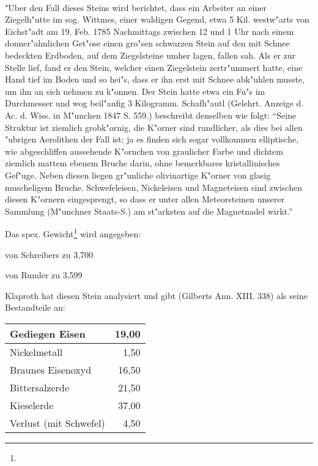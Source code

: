 \documentclass[a4paper, 11pt, oneside]{article}
\begin{document}
\paragraph{}
"Uber den Fall dieses Steins wird berichtet, dass ein Arbeiter an einer Ziegelh"utte im sog. Wittmes, einer waldigen Gegend, etwa 5 Kil. westw"arts von Eichst"adt am 19. Feb. 1785 Nachmittags zwischen 12 und 1 Uhr nach einem donner"ahnlichen Get"ose einen gro"sen schwarzen Stein auf den mit Schnee bedeckten Erdboden, auf dem Ziegelsteine umher lagen, fallen sah. Als er zur Stelle lief, fand er den Stein, welcher einen Ziegelstein zertr"ummert hatte, eine Hand tief im Boden und so hei"s, dass er ihn erst mit Schnee abk"uhlen musste, um ihn an sich nehmen zu k"onnen. Der Stein hatte etwa ein Fu"s im Durchmesser und wog beil"aufig 3 Kilogramm. Schafh"autl (Gelehrt. Anzeige d. Ac. d. Wiss. in M"unchen 1847 S. 559.) beschreibt denselben wie folgt: "`Seine Struktur ist ziemlich grobk"ornig, die K"orner sind rundlicher, als dies bei allen "ubrigen Aerolithen der Fall ist; ja es finden sich sogar vollkommen elliptische, wie abgeschliffen aussehende K"ornchen von graulicher Farbe und dichtem ziemlich mattem ebenem Bruche darin, ohne bemerkbares kristallinisches Gef"uge. Neben diesen liegen gr"unliche olivinartige K"orner von glasig muscheligem Bruche. Schwefeleisen, Nickeleisen und Magneteisen sind zwischen diesen K"ornern eingesprengt, so dass er unter allen Meteorsteinen unserer Sammlung (M"unchner Staats-S.) am st"arksten auf die Magnetnadel wirkt."'

Das spez. Gewicht\footnote{} wird angegeben:

von Schreibers zu 3,700

von Rumler zu 3,599

Klaproth hat diesen Stein analysiert und gibt (Gilberts Ann. XIII. 338) als seine Bestandteile an:
\begin{center}
    \begin{tabular}{ |l|r| } 
    \hline
    Gediegen Eisen & 19,00\\\hline
    Nickelmetall & 1,50\\\hline
    Braunes Eisenoxyd & 16,50\\\hline
    Bittersalzerde & 21,50\\\hline
    Kieselerde & 37,00\\\hline
    Verlust (mit Schwefel) & 4,50\\
    \hline
    \end{tabular}
\end{center}
\end{document}

